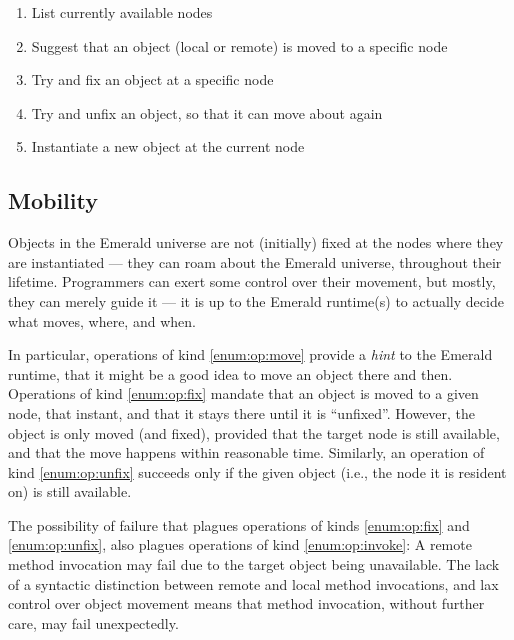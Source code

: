 \begin{enumerate}[label=(1\alph*)]

\item List currently available nodes

\item Suggest that an object (local or remote) is moved to a specific
node \label{enum:op:move}

\item Try and fix an object at a specific node \label{enum:op:fix}

\item Try and unfix an object, so that it can move about again
\label{enum:op:unfix}

\item Instantiate a new object at the current node \label{enum:op:new}

\end{enumerate}

\subsection*{Mobility}

Objects in the Emerald universe are not (initially) fixed at the nodes
where they are instantiated --- they can roam about the Emerald
universe, throughout their lifetime. Programmers can exert some
control over their movement, but mostly, they can merely guide it ---
it is up to the Emerald runtime(s) to actually decide what moves,
where, and when.

In particular, operations of kind \ref{enum:op:move} provide a
\emph{hint} to the Emerald runtime, that it might be a good idea to
move an object there and then. Operations of kind \ref{enum:op:fix}
mandate that an object is moved to a given node, that instant, and
that it stays there until it is ``unfixed''. However, the object is
only moved (and fixed), provided that the target node is still
available, and that the move happens within reasonable time.
Similarly, an operation of kind \ref{enum:op:unfix} succeeds only if
the given object (i.e., the node it is resident on) is still
available.

The possibility of failure that plagues operations of kinds
\ref{enum:op:fix} and \ref{enum:op:unfix}, also plagues operations of
kind \ref{enum:op:invoke}: A remote method invocation may fail due to
the target object being unavailable. The lack of a syntactic
distinction between remote and local method invocations, and lax
control over object movement means that method invocation, without
further care, may fail unexpectedly.

